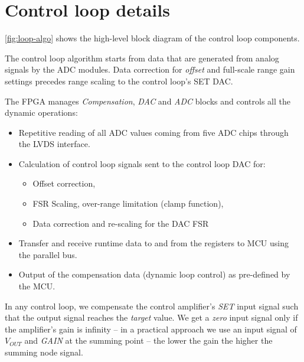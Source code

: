 

\section{Control loop details}
\label{sec:loopdetails}

\autoref{fig:loop-algo} shows the high-level block diagram of the control loop
components.

The control loop algorithm starts from data that are generated from analog
signals by the \ac{ADC} modules.
Data correction for \emph{offset} and full-scale range gain settings precedes
range scaling to the control loop's SET DAC.

The \acs{FPGA} manages \emph{Compensation}, \emph{\acs{DAC}} and
\emph{\acs{ADC}} blocks and controls all the dynamic operations:

\begin{itemize}[topsep=8pt,itemsep=4pt,partopsep=4pt, parsep=4pt]
    \item Repetitive reading of all ADC values coming from five ADC chips
    through the \ac{LVDS} interface.

    \item Calculation of control loop signals sent to the control loop DAC for:
    \begin{itemize}[topsep=8pt,itemsep=4pt,partopsep=4pt, parsep=4pt]
        \item Offset correction,
        \item \acs{FSR} Scaling, over-range limitation (clamp function),
        \item Data correction and re-scaling for the DAC \acs{FSR}
    \end{itemize}

    \item Transfer and receive runtime data to and from the registers to
    \ac{MCU} using the parallel bus.
    \item Output of the compensation data (dynamic loop control) as pre-defined
    by the \ac{MCU}.

\end{itemize}

In any control loop, we compensate the control amplifier's \emph{SET} input
signal such that the output signal reaches the \emph{target} value.
We get a \emph{zero} input signal only if the amplifier’s gain is infinity – in
a practical approach we use an input signal of $V_{OUT}$ and \emph {GAIN} at the
summing point – the lower the gain the higher the summing node signal.

